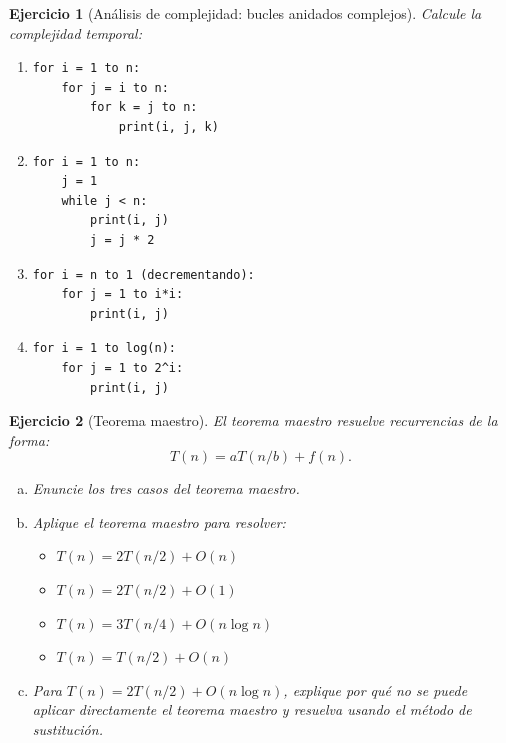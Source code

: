 \documentclass[12pt]{article}
\newtheorem{exercise}{Ejercicio}
\begin{document}
\begin{exercise}[Análisis de complejidad: bucles anidados complejos]
Calcule la complejidad temporal:
\begin{enumerate}
\item 
\begin{verbatim}
for i = 1 to n:
    for j = i to n:
        for k = j to n:
            print(i, j, k)
\end{verbatim}
\item 
\begin{verbatim}
for i = 1 to n:
    j = 1
    while j < n:
        print(i, j)
        j = j * 2
\end{verbatim}
\item 
\begin{verbatim}
for i = n to 1 (decrementando):
    for j = 1 to i*i:
        print(i, j)
\end{verbatim}
\item 
\begin{verbatim}
for i = 1 to log(n):
    for j = 1 to 2^i:
        print(i, j)
\end{verbatim}
\end{enumerate}
\end{exercise}

\begin{exercise}[Teorema maestro]
El teorema maestro resuelve recurrencias de la forma:
\[
T(n) = aT(n/b) + f(n).
\]
\begin{enumerate}[(a)]
\item Enuncie los tres casos del teorema maestro.
\item Aplique el teorema maestro para resolver:
   \begin{itemize}
   \item $T(n) = 2T(n/2) + O(n)$ 
   \item $T(n) = 2T(n/2) + O(1)$
   \item $T(n) = 3T(n/4) + O(n \log n)$
   \item $T(n) = T(n/2) + O(n)$
   \end{itemize}
\item Para $T(n) = 2T(n/2) + O(n \log n)$, explique por qué no se puede aplicar directamente el teorema maestro y resuelva usando el método de sustitución.
\end{enumerate}
\end{exercise}
\end{document}

